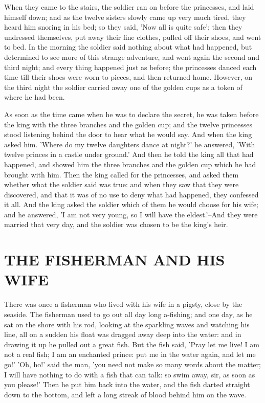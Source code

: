\documentclass[12pt]{book}
\begin{document}
When they came to the stairs, the soldier ran on before the
princesses, and laid himself down; and as the twelve sisters slowly
came up very much tired, they heard him snoring in his bed; so they
said, 'Now all is quite safe'; then they undressed themselves, put
away their fine clothes, pulled off their shoes, and went to bed. In
the morning the soldier said nothing about what had happened, but
determined to see more of this strange adventure, and went again the
second and third night; and every thing happened just as before; the
princesses danced each time till their shoes were worn to pieces, and
then returned home. However, on the third night the soldier carried
away one of the golden cups as a token of where he had been.

As soon as the time came when he was to declare the secret, he was
taken before the king with the three branches and the golden cup; and
the twelve princesses stood listening behind the door to hear what he
would say. And when the king asked him. 'Where do my twelve daughters
dance at night?' he answered, 'With twelve princes in a castle under
ground.' And then he told the king all that had happened, and showed
him the three branches and the golden cup which he had brought with
him. Then the king called for the princesses, and asked them whether
what the soldier said was true: and when they saw that they were
discovered, and that it was of no use to deny what had happened, they
confessed it all. And the king asked the soldier which of them he
would choose for his wife; and he answered, 'I am not very young, so I
will have the eldest.'--And they were married that very day, and the
soldier was chosen to be the king's heir.



\chapter{THE FISHERMAN AND HIS WIFE}

There was once a fisherman who lived with his wife in a pigsty, close
by the seaside. The fisherman used to go out all day long a-fishing;
and one day, as he sat on the shore with his rod, looking at the
sparkling waves and watching his line, all on a sudden his float was
dragged away deep into the water: and in drawing it up he pulled out a
great fish. But the fish said, 'Pray let me live! I am not a real
fish; I am an enchanted prince: put me in the water again, and let me
go!' 'Oh, ho!' said the man, 'you need not make so many words about
the matter; I will have nothing to do with a fish that can talk: so
swim away, sir, as soon as you please!' Then he put him back into the
water, and the fish darted straight down to the bottom, and left a
long streak of blood behind him on the wave.
\end{document}
